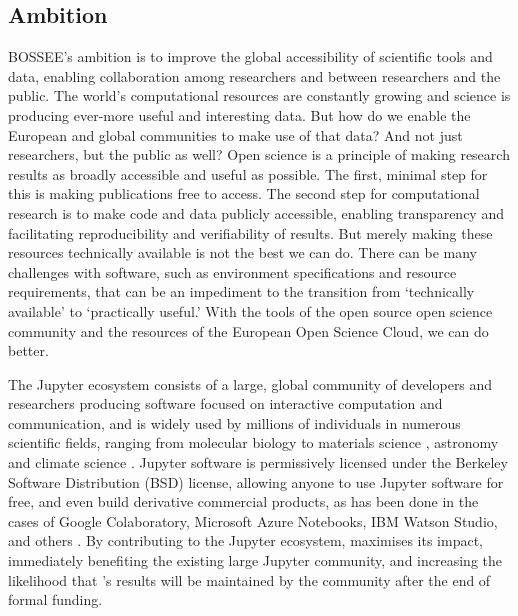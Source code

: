 
\subsection{Ambition}



BOSSEE's ambition is to improve the global accessibility of scientific
tools and data, enabling collaboration among researchers and between
researchers and the public.  The world's computational resources are
constantly growing and science is producing ever-more useful and
interesting data.  But how do we enable the European and global
communities to make use of that data?  And not just researchers, but
the public as well?  Open science is a principle of making research
results as broadly accessible and useful as possible.  The first,
minimal step for this is making publications free to access.  The
second step for computational research is to make code and data
publicly accessible, enabling transparency and facilitating
reproducibility and verifiability of results.  But merely making these
resources technically available is not the best we can do.  There can
be many challenges with software, such as environment specifications
and resource requirements, that can be an impediment to the transition
from `technically available' to `practically useful.'  With the tools
of the open source open science community and the resources of the
European Open Science Cloud, we can do better.

The Jupyter ecosystem consists of a large, global community of
developers and researchers producing software focused on interactive
computation and communication, and is widely used by millions of
individuals in numerous scientific fields, ranging from molecular
biology \cite{Wang2016} to materials science \cite{Hughes2014},
astronomy \cite{Baron2017} and climate science
\cite{Laken2015,Laken2015b}.  Jupyter software is permissively
licensed under the Berkeley Software Distribution (BSD) license,
allowing anyone to use Jupyter software for free, and even build
derivative commercial products, as has been done in the cases of
Google Colaboratory, Microsoft Azure Notebooks, IBM Watson Studio, and
others .  By contributing to the Jupyter ecosystem,
\TheProject maximises its impact, immediately benefiting the existing
large Jupyter community, and increasing the likelihood that
\TheProject's results will be maintained by the community after the
end of formal funding.

